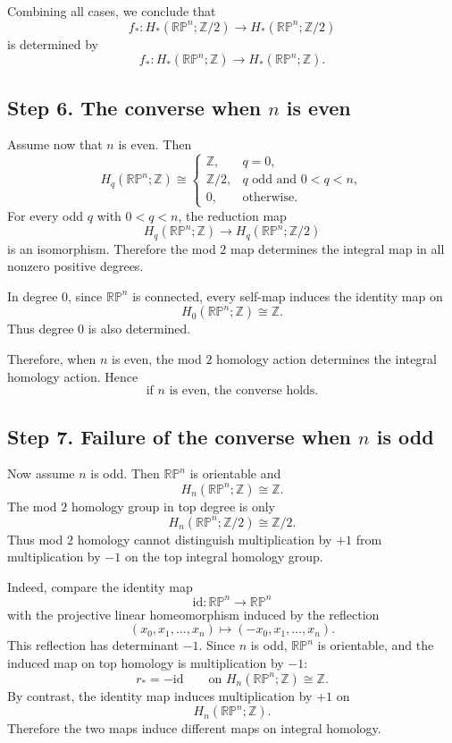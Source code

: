 \documentclass[12pt,a4paper]{article}
\theoremstyle{notespace}
\begin{document}
Combining all cases, we conclude that
\[
\boxed{
	f_*:H_*(\mathbb{RP}^n;\mathbb Z/2)
	\longrightarrow
	H_*(\mathbb{RP}^n;\mathbb Z/2)
}
\]
is determined by
\[
\boxed{
	f_*:H_*(\mathbb{RP}^n;\mathbb Z)
	\longrightarrow
	H_*(\mathbb{RP}^n;\mathbb Z).
}
\]

\subsection*{Step 6. The converse when \(n\) is even}

Assume now that \(n\) is even. Then
\[
H_q(\mathbb{RP}^n;\mathbb Z)
\cong
\begin{cases}
	\mathbb Z, & q=0,\\[1mm]
	\mathbb Z/2, & q \text{ odd and }0<q<n,\\[1mm]
	0, & \text{otherwise}.
\end{cases}
\]
For every odd \(q\) with \(0<q<n\), the reduction map
\[
H_q(\mathbb{RP}^n;\mathbb Z)
\longrightarrow
H_q(\mathbb{RP}^n;\mathbb Z/2)
\]
is an isomorphism. Therefore the mod \(2\) map determines the integral map in all nonzero positive degrees.

In degree \(0\), since \(\mathbb{RP}^n\) is connected, every self-map induces the identity map on
\[
H_0(\mathbb{RP}^n;\mathbb Z)\cong \mathbb Z.
\]
Thus degree \(0\) is also determined.

Therefore, when \(n\) is even, the mod \(2\) homology action determines the integral homology action. Hence
\[
\boxed{
	\text{if }n\text{ is even, the converse holds.}
}
\]

\subsection*{Step 7. Failure of the converse when \(n\) is odd}

Now assume \(n\) is odd. Then \(\mathbb{RP}^n\) is orientable and
\[
H_n(\mathbb{RP}^n;\mathbb Z)\cong \mathbb Z.
\]
The mod \(2\) homology group in top degree is only
\[
H_n(\mathbb{RP}^n;\mathbb Z/2)\cong \mathbb Z/2.
\]
Thus mod \(2\) homology cannot distinguish multiplication by \(+1\) from multiplication by \(-1\) on the top integral homology group.

Indeed, compare the identity map
\[
\mathrm{id}:\mathbb{RP}^n\longrightarrow \mathbb{RP}^n
\]
with the projective linear homeomorphism induced by the reflection
\[
(x_0,x_1,\dots,x_n)\longmapsto (-x_0,x_1,\dots,x_n).
\]
This reflection has determinant \(-1\). Since \(n\) is odd, \(\mathbb{RP}^n\) is orientable, and the induced map on top homology is multiplication by \(-1\):
\[
r_*=-\mathrm{id}
\qquad
\text{on }
H_n(\mathbb{RP}^n;\mathbb Z)\cong \mathbb Z.
\]
By contrast, the identity map induces multiplication by \(+1\) on
\[
H_n(\mathbb{RP}^n;\mathbb Z).
\]
Therefore the two maps induce different maps on integral homology.
\end{document}
